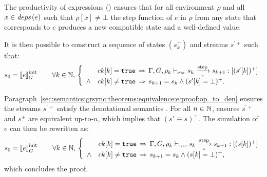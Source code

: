 \begin{skippableproof}
    The productivity of \GRSync expressions ()
    ensures that for all environment $\rho$ and all $x \in {\ensuremath{\textit{deps}\left(e\right)}}$ such that $\rho[x] \neq \bot$
    the step function of $e$ in $\rho$ from any state that corresponds to $e$ produces a new
    compatible state and a well-defined value.

    It is then possible to construct a sequence of states $(s_k^+)$ and streams $s^{\prime+}$ such
    that:
    \begin{equation*}
        s_0 = \initsync{e} \qquad
        \forall k \in \N, \,
        \left\{
        \begin{array}{ll}
                   & ck[k] = \true \, \Rightarrow \,
            \exprOpsem{\rho_k}{s_k}{e}{s_{k+1}}{(s'[k])^+} \\
            \wedge & ck[k] \neq \true \, \Rightarrow \,
            s_{k+1} = s_k \wedge (s'[k] = \bot)^+.         \\
        \end{array}
        \right.
    \end{equation*}

    Paragraph~\ref{sec:semantics:grsync:theorems:equivalence:e:proof:op_to_den} ensures the streams
    $s^{\prime+}$ satisfy the denotational semantics . For all
    $n \in \mathbb{N}$,  ensures $s^{\prime+}$ and $s^+$ are
    equivalent up-to-$n$, which implies that $(s' \equiv s)^+$. The simulation of $e$ can then be
    rewritten as:
    \begin{equation*}
        s_0 = \initsync{e} \qquad
        \forall k \in \N, \,
        \left\{
        \begin{array}{ll}
                   & ck[k] = \true \, \Rightarrow \,
            \exprOpsem{\rho_k}{s_k}{e}{s_{k+1}}{(s[k])^+} \\
            \wedge & ck[k] \neq \true \, \Rightarrow \,
            s_{k+1} = s_k \wedge (s[k] = \bot)^+,         \\
        \end{array}
        \right.
    \end{equation*}
    which concludes the proof.

    \setcounter{paragraph}{0}
    \setcounter{subparagraph}{0}
\end{skippableproof}

